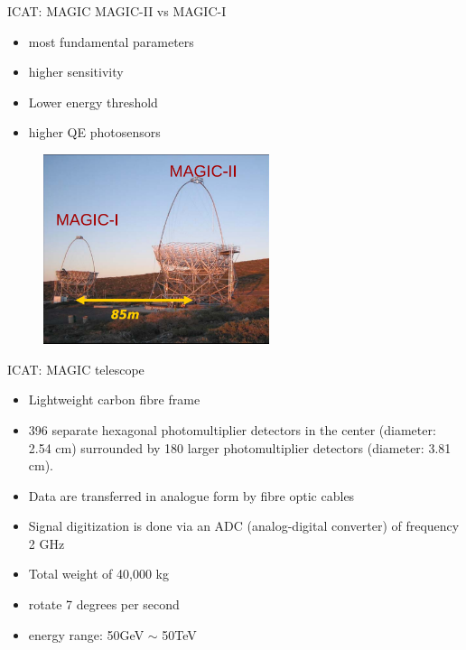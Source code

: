 \documentclass{beamer}
\begin{document}
\begin{frame}{ICAT: MAGIC}
    MAGIC-II vs MAGIC-I
    \begin{itemize}
        \item most fundamental parameters
        \item higher sensitivity
        \item Lower energy threshold
        \item higher QE photosensors
    \end{itemize}

    \begin{figure}[h]
        \includegraphics[width=250px]{MAGIC_12.png}
    \end{figure}
\end{frame}


\begin{frame}{ICAT: MAGIC telescope}
	\begin{itemize}
        \item Lightweight carbon fibre frame
        \item 396 separate hexagonal photomultiplier detectors in the center (diameter: 2.54 cm) surrounded by 180 larger photomultiplier detectors (diameter: 3.81 cm).
        \item Data are transferred in analogue form by fibre optic cables
        \item Signal digitization is done via an ADC (analog-digital converter) of frequency 2 GHz
        \item Total weight of 40,000 kg
        \item rotate 7 degrees per second
        \item energy range: 50GeV $\sim$ 50TeV
	\end{itemize}
\end{frame}
\end{document}
